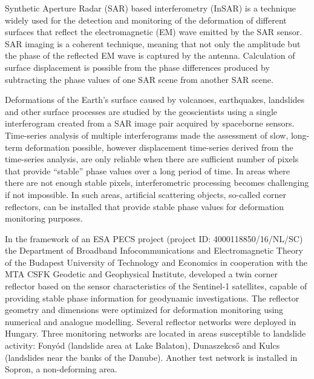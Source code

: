 \documentclass[a0, 18pt, landscape]{a0poster}
\begin{document}
\begin{mdframed}[linecolor=red!80!black, linewidth=4pt,
    innerleftmargin=20pt, innerrightmargin=20pt,
    innerbottommargin=25pt, innertopmargin=30pt,
    backgroundcolor=green!10!white,
    frametitleaboveskip=15pt, frametitlebelowskip=10pt,
    roundcorner=20pt, frametitle={\LARGE Abstract},
    frametitlealignment=\center]

\begin{multicols}{2}

Synthetic Aperture Radar (SAR) based interferometry (InSAR) is a technique widely used for the detection and monitoring of the deformation of different surfaces that reflect the electromagnetic (EM) wave emitted by the SAR sensor. SAR imaging is a coherent technique, meaning that not only the amplitude but the phase of the reflected EM wave is captured by the antenna. Calculation of surface displacement is possible from the phase differences produced by subtracting the phase values of one SAR scene from another SAR scene.

Deformations of the Earth’s surface caused by volcanoes, earthquakes, landslides and other surface processes are studied by the geoscientists using a single interferogram created from a SAR image pair acquired by spaceborne sensors. Time-series analysis of multiple interferograms made the assessment of slow, long-term deformation  possible, however displacement time-series derived from the time-series analysis, are only reliable when there are sufficient number of pixels that provide ``stable'' phase values over a long period of time. In areas where there are not enough stable pixels, interferometric processing becomes challenging if not impossible. In such areas, artificial scattering objects, so-called corner reflectors, can be installed that provide stable phase values for deformation monitoring purposes.

In the framework of an ESA PECS project (project ID: 4000118850/16/NL/SC) the Department of Broadband Infocommunications and Electromagnetic Theory of the Budapest University of Technology and Economics in cooperation with the MTA CSFK Geodetic and Geophysical Institute, developed a twin corner reflector based on the sensor characteristics of the Sentinel-1 satellites, capable of providing stable phase information for geodynamic investigations. The reflector geometry and dimensions were optimized for deformation monitoring using numerical and analogue modelling.
Several reflector networks were deployed  in Hungary. Three monitoring networks are located in areas susceptible to landslide activity: Fonyód (landslide area at Lake Balaton), Dunaszekcső and Kulcs (landslides near the banks of the Danube). Another test network is installed in Sopron, a non-deforming area.


\end{multicols}
\end{mdframed}
\end{document}
